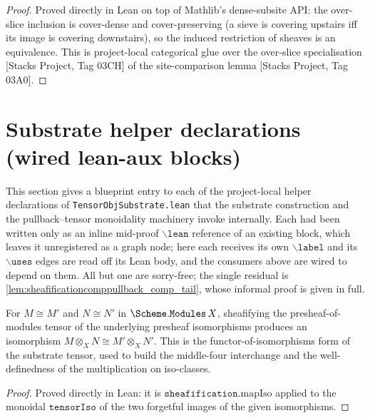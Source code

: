 \begin{proof}
  Proved directly in Lean on top of Mathlib's dense-subsite API: the over-slice inclusion
  is cover-dense and cover-preserving (a sieve is covering upstairs iff its image is
  covering downstairs), so the induced restriction of sheaves is an equivalence. This is
  project-local categorical glue over the over-slice specialisation
  [Stacks Project, Tag 03CH] of the site-comparison lemma [Stacks Project, Tag 03A0].
\end{proof}

\section{Substrate helper declarations (wired lean-aux blocks)}
\label{sec:tensorobj_substrate_helpers}

This section gives a blueprint entry to each of the project-local helper declarations
of \texttt{TensorObjSubstrate.lean} that the substrate construction and the
pullback--tensor monoidality machinery invoke internally. Each had been written only
as an inline mid-proof \(\mathtt{\backslash lean}\) reference of an existing block,
which leaves it unregistered as a graph node; here each receives its own \(\mathtt{\backslash label}\)
and its \(\mathtt{\backslash uses}\) edges are read off its Lean body, and the consumers
above are wired to depend on them. All but one are sorry-free; the single residual is
\cref{lem:sheafificationcomppullback_comp_tail}, whose informal proof is given in full.

\begin{definition}
  \label{def:tensorobjisoofiso}
  For \(M \cong M'\) and \(N \cong N'\) in \(\Scheme.\mathtt{Modules}\,X\), sheafifying the
  presheaf-of-modules tensor of the underlying presheaf isomorphisms produces an
  isomorphism \(M \otimes_X N \cong M' \otimes_X N'\). This is the functor-of-isomorphisms
  form of the substrate tensor, used to build the middle-four interchange and the
  well-definedness of the multiplication on iso-classes.
\end{definition}
\begin{proof}
  \leanok
  Proved directly in Lean: it is \(\mathtt{sheafification}.\mathrm{mapIso}\) applied to the
  monoidal \(\mathtt{tensorIso}\) of the two forgetful images of the given isomorphisms.
\end{proof}

